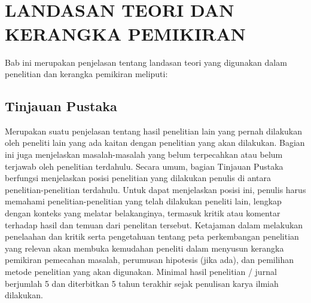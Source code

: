
\chapter[LANDASAN TEORI DAN KERANGKA PEMIKIRAN]{\\ LANDASAN TEORI DAN KERANGKA PEMIKIRAN}

Bab ini merupakan penjelasan tentang landasan teori yang digunakan dalam penelitian dan kerangka pemikiran meliputi:

\section{Tinjauan Pustaka}
\begin{sectioncontent}
    \hspace{\parindent}Merupakan suatu penjelasan tentang hasil penelitian lain yang pernah dilakukan oleh  peneliti lain yang ada kaitan dengan penelitian yang akan dilakukan. Bagian ini juga menjelaskan masalah-masalah yang belum terpecahkan atau belum terjawab oleh penelitian terdahulu. Secara umum, bagian Tinjauan Pustaka berfungsi menjelaskan posisi penelitian yang dilakukan penulis di antara penelitian-penelitian terdahulu. Untuk dapat menjelaskan posisi ini, penulis harus memahami penelitian-penelitian yang telah dilakukan peneliti lain, lengkap dengan konteks yang melatar belakanginya, termasuk kritik atau komentar terhadap hasil dan temuan dari penelitan tersebut. Ketajaman dalam melakukan penelaahan dan kritik serta pengetahuan tentang peta perkembangan penelitian yang relevan akan membuka kemudahan peneliti dalam menyusun kerangka pemikiran pemecahan masalah, perumusan hipotesis (jika ada), dan pemilihan metode penelitian yang akan digunakan. Minimal hasil penelitian / jurnal berjumlah 5 dan diterbitkan 5 tahun terakhir sejak penulisan karya ilmiah dilakukan.
\end{sectioncontent}

